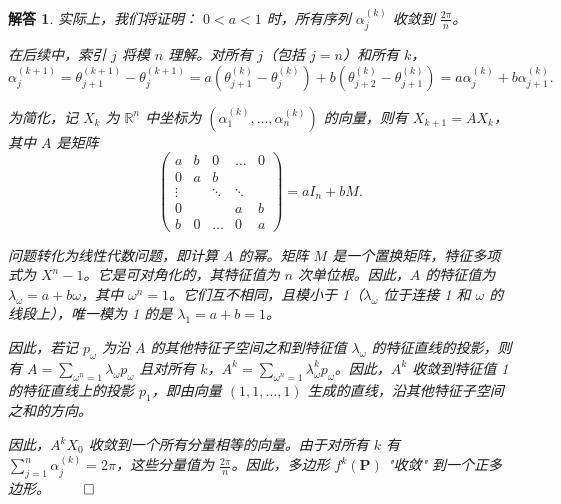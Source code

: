 \documentclass[12pt,UTF8,fontset=none]{ctexbook}
\theoremstyle{exercisestyle}
\theoremstyle{solutionstyle}
\newtheorem*{solution*}{解答}
\newenvironment{solution}
  {\begin{solution*}}
  {\hfill\ensuremath{\qed}\end{solution*}}
\begin{document}
\begin{solution}
实际上，我们将证明： \(0 < a < 1\) 时，所有序列 \(\alpha_j^{(k)}\) 收敛到 \(\displaystyle\frac{2\pi}{n}\)。

在后续中，索引 \(j\) 将模 \(n\) 理解。对所有 \(j\)（包括 \(j = n\)）和所有 \(k\)，
\[
\alpha_j^{(k+1)} = \theta_{j+1}^{(k+1)} - \theta_j^{(k+1)} = a(\theta_{j+1}^{(k)} - \theta_j^{(k)}) + b(\theta_{j+2}^{(k)} - \theta_{j+1}^{(k)}) = a\alpha_j^{(k)} + b\alpha_{j+1}^{(k)}.
\]

为简化，记 \(X_k\) 为 \(\mathbb{R}^n\) 中坐标为 \((\alpha_1^{(k)},\ldots,\alpha_n^{(k)})\) 的向量，则有 \(X_{k+1} = A X_k\)，其中 \(A\) 是矩阵
\[
\begin{pmatrix}
a & b & 0 & \dots & 0 \\
0 & a & b & & \\
\vdots & & \ddots & \ddots & \\
0 & & & a & b \\
b & 0 & \dots & 0 & a
\end{pmatrix} = a I_n + b M.
\]

问题转化为线性代数问题，即计算 \(A\) 的幂。矩阵 \(M\) 是一个置换矩阵，特征多项式为 \(X^n - 1\)。它是可对角化的，其特征值为 \(n\) 次单位根。因此，\(A\) 的特征值为 \(\lambda_{\omega} = a + b \omega\)，其中 \(\omega^{n} = 1\)。它们互不相同，且模小于 1（\(\lambda_{\omega}\) 位于连接 1 和 \(\omega\) 的线段上），唯一模为 1 的是 \(\lambda_1 = a + b = 1\)。

因此，若记 \(p_{\omega}\) 为沿 \(A\) 的其他特征子空间之和到特征值 \(\lambda_{\omega}\) 的特征直线的投影，则有 \(A = \sum_{\omega^n=1} \lambda_{\omega} p_{\omega}\) 且对所有 \(k\)，\(A^k = \sum_{\omega^n=1} \lambda_{\omega}^k p_{\omega}\)。因此，\(A^k\) 收敛到特征值 1 的特征直线上的投影 \(p_1\)，即由向量 \((1, 1, \ldots, 1)\) 生成的直线，沿其他特征子空间之和的方向。

因此，\(A^k X_0\) 收敛到一个所有分量相等的向量。由于对所有 \(k\) 有 \(\sum_{j=1}^{n} \alpha_j^{(k)} = 2\pi\)，这些分量值为 \(\frac{2\pi}{n}\)。因此，多边形 \(f^k(\mathbf{P})\) "收敛" 到一个正多边形。
\end{solution}
\end{document}

